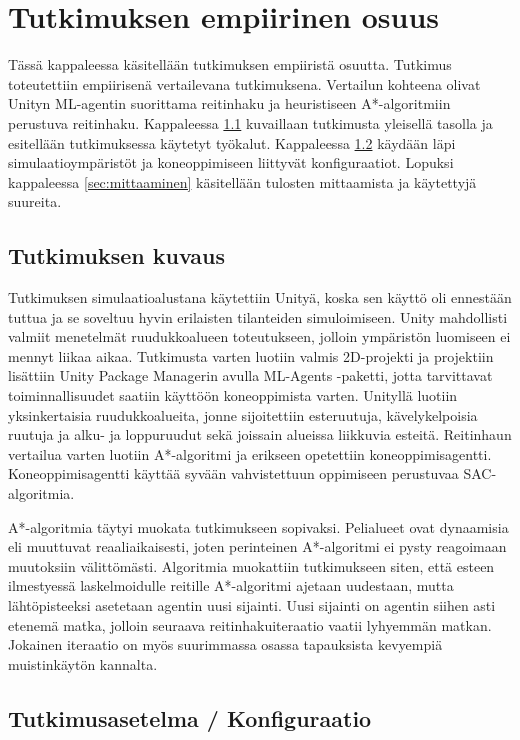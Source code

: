 \documentclass[utf8]{gradu3}
\begin{document}
\chapter{Tutkimuksen empiirinen osuus}

Tässä kappaleessa käsitellään tutkimuksen empiiristä osuutta. Tutkimus toteutettiin empiirisenä vertailevana tutkimuksena. Vertailun kohteena olivat Unityn ML-agentin suorittama reitinhaku ja heuristiseen A*-algoritmiin perustuva reitinhaku. Kappaleessa \ref{sec:tutkimuksenkuvaus} kuvaillaan tutkimusta yleisellä tasolla ja esitellään tutkimuksessa käytetyt työkalut. Kappaleessa \ref{sec:tutkimusasetelma} käydään läpi simulaatioympäristöt ja koneoppimiseen liittyvät konfiguraatiot. Lopuksi kappaleessa \ref{sec:mittaaminen} käsitellään tulosten mittaamista ja käytettyjä suureita.

\section{Tutkimuksen kuvaus}
\label{sec:tutkimuksenkuvaus}

Tutkimuksen simulaatioalustana käytettiin Unityä, koska sen käyttö oli ennestään tuttua ja se soveltuu hyvin erilaisten tilanteiden simuloimiseen. Unity mahdollisti valmiit menetelmät ruudukkoalueen toteutukseen, jolloin ympäristön luomiseen ei mennyt liikaa aikaa. Tutkimusta varten luotiin valmis 2D-projekti ja projektiin lisättiin Unity Package Managerin avulla ML-Agents -paketti, jotta tarvittavat toiminnallisuudet saatiin käyttöön koneoppimista varten. Unityllä luotiin yksinkertaisia ruudukkoalueita, jonne sijoitettiin esteruutuja, kävelykelpoisia ruutuja ja alku- ja loppuruudut sekä joissain alueissa liikkuvia esteitä. Reitinhaun vertailua varten luotiin A*-algoritmi ja erikseen opetettiin koneoppimisagentti. Koneoppimisagentti käyttää syvään vahvistettuun oppimiseen perustuvaa SAC-algoritmia.

A*-algoritmia täytyi muokata tutkimukseen sopivaksi. Pelialueet ovat dynaamisia eli muuttuvat reaaliaikaisesti, joten perinteinen A*-algoritmi ei pysty reagoimaan muutoksiin välittömästi. Algoritmia muokattiin tutkimukseen siten, että esteen ilmestyessä laskelmoidulle reitille A*-algoritmi ajetaan uudestaan, mutta lähtöpisteeksi asetetaan agentin uusi sijainti. Uusi sijainti on agentin siihen asti etenemä matka, jolloin seuraava reitinhakuiteraatio vaatii lyhyemmän matkan. Jokainen iteraatio on myös suurimmassa osassa tapauksista kevyempiä muistinkäytön kannalta.

\section{Tutkimusasetelma / Konfiguraatio}
\label{sec:tutkimusasetelma}
\end{document}
